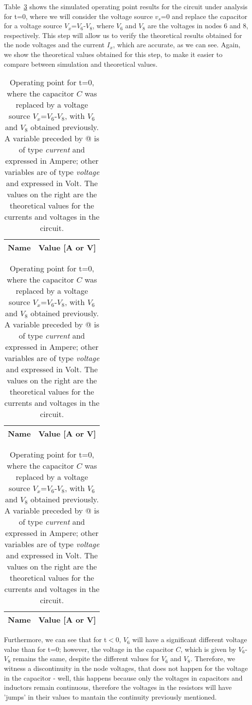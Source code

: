 	Table~\ref{tab2:op} shows the simulated operating point results for the circuit
under analysis for t=0, where we will consider the voltage source $v_s$=0 and replace the
capacitor for a voltage source $V_x$=$V_6$-$V_8$, where $V_6$ and $V_8$ are the voltages in
nodes 6 and 8, respectively. This step will allow us to verify the theoretical results obtained 
for the node voltages and the current $I_x$, which are accurate, as we can see. Again, we show
the theoretical values obtained for this step, to make it easier to compare between simulation
and theoretical values.



\begin{table}[H]
  \centering
  \begin{tabular}{|l|r|}
    \hline    
    {\bf Name} & {\bf Value [A or V]} \\ \hline
    
  \end{tabular}
  \begin{tabular}{|l|r|}
    \hline    
    {\bf Name} & {\bf Value [A or V]} \\ \hline
    
  \end{tabular}
  \begin{tabular}{|l|r|}
    \hline    
    {\bf Name} & {\bf Value [A or V]} \\ \hline
    
  \end{tabular}
  \caption{Operating point for t=0, where the capacitor $C$ was replaced by a voltage source $V_x$=$V_6$-$V_8$, with $V_6$ and $V_8$ obtained previously. 
  A variable preceded by @ is of type {\em current} and expressed in Ampere; other variables are of type {\it voltage} and expressed in Volt. The values on the right are the theoretical 
  values for the currents and voltages in the circuit.}
  \label{tab2:op}
\end{table}


Furthermore, we can see that for t$<$0, $V_6$ will have a significant different voltage value than for t=0; however, the voltage in the capacitor $C$, which is given by $V_6$-$V_8$ remains the same, despite the different values for $V_6$ and $V_8$. Therefore, we witness a discontinuity in the node voltages,
that does not happen for the voltage in the capacitor - well, this happens because only the voltages in capacitors and inductors remain continuous, therefore the voltages in the resistors will have 'jumps' in their values to mantain the continuity previously mentioned. 


